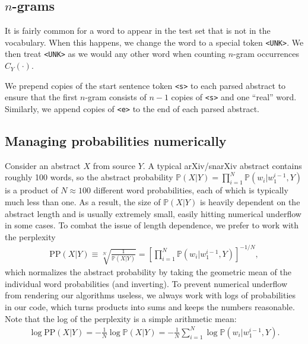 \documentclass{article}
\renewcommand{\P}{\mathbb{P}}
\begin{document}
\subsection{$n$-grams}
It is fairly common for a word to appear in the test set that is not in the vocabulary.
When this happens, we change the word to a special token \texttt{<UNK>}.
We then treat \texttt{<UNK>} as we would any other word when counting $n$-gram occurrences $C_Y(\cdot)$.

We prepend copies of the start sentence token \texttt{<s>} to each parsed abstract to ensure that the first $n$-gram consists of $n-1$ copies of \texttt{<s>} and one ``real'' word.
Similarly, we append copies of \texttt{<e>} to the end of each parsed abstract.

\subsection{Managing probabilities numerically}
Consider an abstract $X$ from source $Y$.
A typical arXiv/snarXiv abstract contains roughly 100 words, so the abstract probability $\P(X|Y)=\prod_{i=1}^N \P(w_i|w_1^{i-1},Y)$ is a product of $N\approx100$ different word probabilities, each of which is typically much less than one.
As a result, the size of $\P(X|Y)$ is heavily dependent on the abstract length and is usually extremely small, easily hitting numerical underflow in some cases.
To combat the issue of length dependence, we prefer to work with the perplexity
\begin{align}
	\text{PP}(X|Y) \equiv \sqrt[N]{\frac{1}{\P(X|Y)}} = \left[ \prod_{i=1}^N \P(w_i|w_1^{i-1},Y) \right]^{-1/N},
\end{align}
which normalizes the abstract probability by taking the geometric mean of the individual word probabilities (and inverting).
To prevent numerical underflow from rendering our algorithms useless, we always work with logs of probabilities in our code, which turns products into sums and keeps the numbers reasonable.
Note that the log of the perplexity is a simple arithmetic mean:
\begin{align}
	\log\text{PP}(X|Y) = -\frac{1}{N}\log\P(X|Y) = -\frac{1}{N} \sum_{i=1}^N \log\P(w_i|w_1^{i-1},Y).
\end{align}







\nocite{*}



\end{document}
